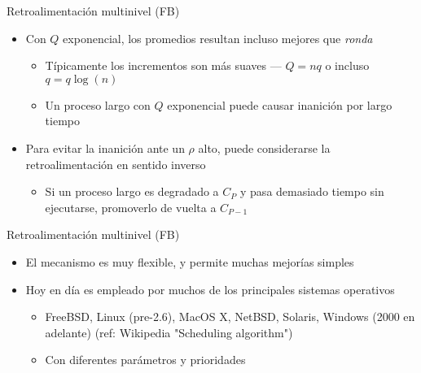 \documentclass[presentation]{beamer}
\begin{document}
\begin{frame}[label={sec:orgce3facf}]{Retroalimentación multinivel (FB)}
\begin{itemize}
\item Con \(Q\) exponencial, los promedios resultan incluso mejores que
\emph{ronda}
\begin{itemize}
\item Típicamente los incrementos son más suaves — \(Q=nq\) o incluso \(q=q\log(n)\)
\item Un proceso largo con \(Q\) exponencial puede causar inanición por
largo tiempo
\end{itemize}
\item Para evitar la inanición ante un \(\rho\) alto, puede considerarse la
retroalimentación en sentido inverso
\begin{itemize}
\item Si un proceso largo es degradado a \(C_P\) y pasa demasiado tiempo
sin ejecutarse, promoverlo de vuelta a \(C_{P-1}\)
\end{itemize}
\end{itemize}
\end{frame}

\begin{frame}[label={sec:org912153a}]{Retroalimentación multinivel (FB)}
\begin{itemize}
\item El mecanismo es muy flexible, y permite muchas mejorías simples
\item Hoy en día es empleado por muchos de los principales sistemas operativos
\begin{itemize}
\item FreeBSD, Linux (pre-2.6), MacOS X, NetBSD, Solaris, Windows (2000
en adelante) (ref: Wikipedia "Scheduling algorithm")
\item Con diferentes parámetros y prioridades
\end{itemize}
\end{itemize}
\end{frame}
\end{document}
